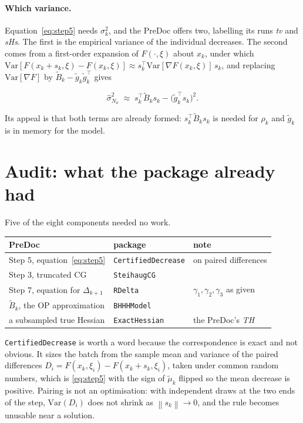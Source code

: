 \documentclass[11pt,a4paper]{article}
\providecommand{\norm}[1]{\left \lVert #1 \right \rVert}
\begin{document}
\paragraph{Which variance.} Equation~\eqref{eq:step5} needs $\sigma_k^2$, and the
PreDoc offers two, labelling its runs \emph{tv} and \emph{sHs}. The first is the
empirical variance of the individual decreases. The second comes from a first-order
expansion of $F(\cdot,\xi)$ about $x_k$, under which
$\mathrm{Var}[F(x_k+s_k,\xi) - F(x_k,\xi)] \approx
 s_k^\top \mathrm{Var}[\nabla F(x_k,\xi)]\, s_k$, and replacing
$\mathrm{Var}[\nabla F]$ by $\tilde B_k - \tilde g_k \tilde g_k^\top$ gives

\begin{equation}
  \hat\sigma_{N_k}^2 \;\approx\; s_k^\top \tilde B_k s_k - \bigl(\tilde g_k^\top s_k\bigr)^2 .
  \label{eq:opvar}
\end{equation}

Its appeal is that both terms are already formed: $s_k^\top\tilde B_ks_k$ is needed
for $\rho_k$ and $\tilde g_k$ is in memory for the model.

\section{Audit: what the package already had}

Five of the eight components needed no work.

\begin{center}
\begin{tabular}{lll}
\toprule
PreDoc & package & note \\
\midrule
Step 5, equation~\eqref{eq:step5} & \texttt{CertifiedDecrease} & on paired differences \\
Step 3, truncated CG & \texttt{SteihaugCG} & \\
Step 7, equation for $\Delta_{k+1}$ & \texttt{RDelta} & $\gamma_1,\gamma_2,\gamma_3$ as given \\
$\tilde B_k$, the OP approximation & \texttt{BHHHModel} & \\
a subsampled true Hessian & \texttt{ExactHessian} & the PreDoc's \emph{TH} \\
\bottomrule
\end{tabular}
\end{center}

\texttt{CertifiedDecrease} is worth a word because the correspondence is exact and
not obvious. It sizes the batch from the sample mean and variance of the paired
differences $D_i = F(x_k,\xi_i) - F(x_k+s_k,\xi_i)$, taken under common random
numbers, which is \eqref{eq:step5} with the sign of $\tilde\mu_k$ flipped so the
mean decrease is positive. Pairing is not an optimisation: with independent draws
at the two ends of the step, $\mathrm{Var}(D_i)$ does not shrink as
$\norm{s_k} \to 0$, and the rule becomes unusable near a solution.
\end{document}
